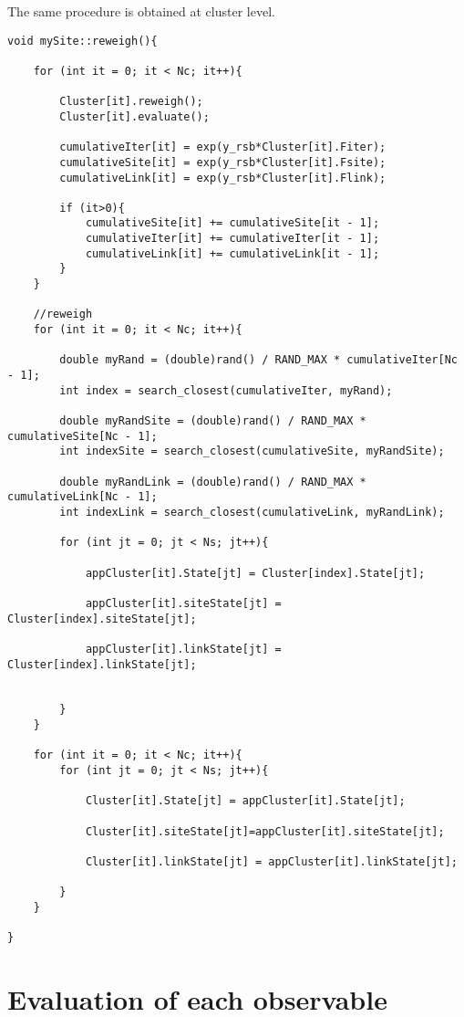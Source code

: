 The same procedure is obtained at cluster level.

\begin{verbatim}
void mySite::reweigh(){

	for (int it = 0; it < Nc; it++){
		
		Cluster[it].reweigh();
		Cluster[it].evaluate();
			
		cumulativeIter[it] = exp(y_rsb*Cluster[it].Fiter);
		cumulativeSite[it] = exp(y_rsb*Cluster[it].Fsite);
		cumulativeLink[it] = exp(y_rsb*Cluster[it].Flink);

		if (it>0){
			cumulativeSite[it] += cumulativeSite[it - 1];
			cumulativeIter[it] += cumulativeIter[it - 1];
			cumulativeLink[it] += cumulativeLink[it - 1];
		}
	}

	//reweigh
	for (int it = 0; it < Nc; it++){

		double myRand = (double)rand() / RAND_MAX * cumulativeIter[Nc - 1];
		int index = search_closest(cumulativeIter, myRand);

		double myRandSite = (double)rand() / RAND_MAX * cumulativeSite[Nc - 1];
		int indexSite = search_closest(cumulativeSite, myRandSite);

		double myRandLink = (double)rand() / RAND_MAX * cumulativeLink[Nc - 1];
		int indexLink = search_closest(cumulativeLink, myRandLink);

		for (int jt = 0; jt < Ns; jt++){
		
			appCluster[it].State[jt] = Cluster[index].State[jt];
		
			appCluster[it].siteState[jt] = Cluster[index].siteState[jt];

			appCluster[it].linkState[jt] = Cluster[index].linkState[jt];
			

		}
	}

	for (int it = 0; it < Nc; it++){
		for (int jt = 0; jt < Ns; jt++){

			Cluster[it].State[jt] = appCluster[it].State[jt];
			
			Cluster[it].siteState[jt]=appCluster[it].siteState[jt];
			
			Cluster[it].linkState[jt] = appCluster[it].linkState[jt];
			
		}
	}

}
\end{verbatim}

\section{Evaluation of each observable}

